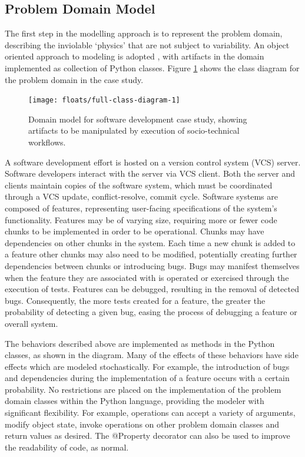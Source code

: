 \documentclass{llncs}
\begin{document}

\subsection{Problem Domain Model}


The first step in the modelling approach is to represent the problem domain, describing the inviolable `physics' that
are not subject to variability. An object oriented approach to modeling is adopted \cite{bennett06object}, with
artifacts in the domain implemented as collection of Python classes.  Figure \ref{fig:domain} shows the class diagram
for the problem domain in the case study.

\begin{figure}[t]
  \centering
  \texttt{[image: floats/full-class-diagram-1]}
  \caption{Domain model for software development case study, showing artifacts to be manipulated by execution of
    socio-technical workflows.}
  \label{fig:domain}
\end{figure}

A software development effort is hosted on a version control system (VCS) server.  Software developers interact with the
server via VCS client.  Both the server and clients maintain copies of the software system, which must be coordinated
through a VCS update, conflict-resolve, commit cycle.  Software systems are composed of features, representing
user-facing specifications of the system's functionality.  Features may be of varying size, requiring more or fewer code
chunks to be implemented in order to be operational.  Chunks may have dependencies on other chunks in the system.  Each
time a new chunk is added to a feature other chunks may also need to be modified, potentially creating further
dependencies between chunks or introducing bugs.  Bugs may manifest themselves when the feature they are associated with
is operated or exercised through the execution of tests.  Features can be debugged, resulting in the removal of detected
bugs.  Consequently, the more tests created for a feature, the greater the probability of detecting a given bug, easing
the process of debugging a feature or overall system.

The behaviors described above are implemented as methods in the Python classes, as shown in the diagram.  Many of the
effects of these behaviors have side effects which are modeled stochastically. For example, the introduction of bugs and
dependencies during the implementation of a feature occurs with a certain probability. No restrictions are placed on the
implementation of the problem domain classes within the Python language, providing the modeler with significant
flexibility.  For example, operations can accept a variety of arguments, modify object state, invoke operations on other
problem domain classes and return values as desired. The @Property decorator can also be used to improve the readability
of code, as normal.
\end{document}

